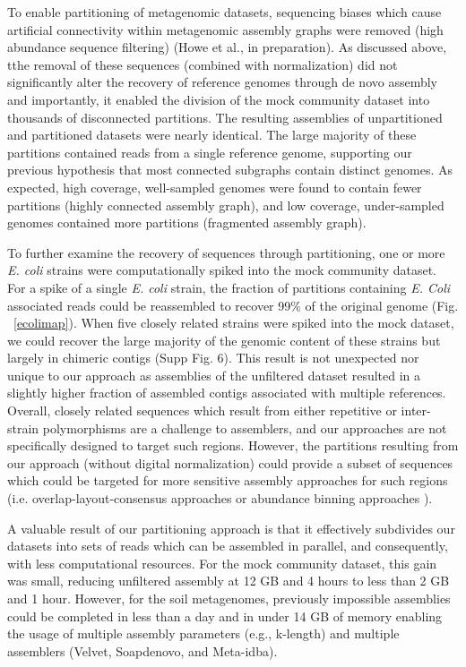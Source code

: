 \documentclass[11pt]{article} %
\begin{document}
To enable partitioning of metagenomic datasets, sequencing biases
which cause artificial connectivity within metagenomic assembly graphs
were removed (high abundance sequence filtering) (Howe et al., in preparation).  
As discussed
above, tthe removal of these sequences (combined with normalization)
did not significantly alter the recovery of reference genomes through
de novo assembly and importantly, it enabled the division of the mock
community dataset into thousands of disconnected partitions.  The
resulting assemblies of unpartitioned and partitioned datasets were
nearly identical.  The large majority of these partitions contained
reads from a single reference genome, supporting our previous
hypothesis that most connected subgraphs contain distinct genomes.  As
expected, high coverage, well-sampled genomes were found to contain
fewer partitions (highly connected assembly graph), and low coverage,
under-sampled genomes contained more partitions (fragmented assembly
graph).

To further examine the recovery of sequences through partitioning, one
or more \emph{E. coli} strains were computationally spiked into the
mock community dataset.  For a spike of a single \emph{E. coli}
strain, the fraction of partitions containing \emph{E. Coli}
associated reads could be reassembled to recover 99\% of the original
genome (Fig. ~\ref{ecolimap}).  When five closely related strains were
spiked into the mock dataset, we could recover the large majority of
the genomic content of these strains but largely in chimeric contigs
(Supp Fig. 6).  This result is not unexpected
nor unique to our approach as assemblies of the unfiltered dataset
resulted in a slightly higher fraction of assembled contigs associated
with multiple references.  Overall, closely related sequences which
result from either repetitive or inter-strain polymorphisms are a
challenge to assemblers, and our approaches are not specifically
designed to target such regions.  However, the partitions resulting
from our approach (without digital normalization) could provide a
subset of sequences which could be targeted for more sensitive
assembly approaches for such regions (i.e. overlap-layout-consensus
approaches or abundance binning approaches \cite{Sharon:2012kx}).

A valuable result of our partitioning approach is that it effectively
subdivides our datasets into sets of reads which can be assembled in
parallel, and consequently, with less computational resources.  For
the mock community dataset, this gain was small, reducing unfiltered
assembly at 12 GB and 4 hours to less than 2 GB and 1 hour.  However,
for the soil metagenomes, previously impossible assemblies could be
completed in less than a day and in under 14 GB of memory enabling the
usage of multiple assembly parameters (e.g., k-length) and multiple
assemblers (Velvet, Soapdenovo, and Meta-idba).
\end{document}
